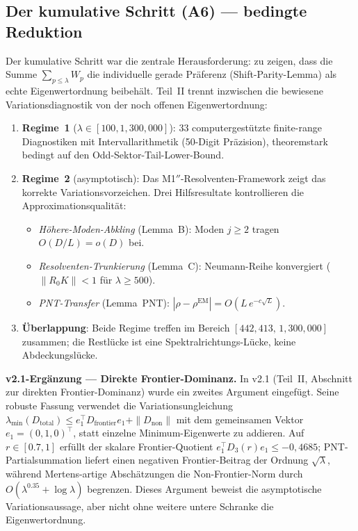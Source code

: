 \documentclass[12pt,a4paper]{article}
\theoremstyle{definition}
\theoremstyle{remark}
\begin{document}
\subsection{Der kumulative Schritt (A6) --- bedingte Reduktion}

Der kumulative Schritt war die zentrale Herausforderung: zu zeigen, dass die Summe $\sum_{p \leq \lambda} W_p$ die individuelle gerade Präferenz (Shift-Parity-Lemma) als echte Eigenwertordnung beibehält. Teil~II trennt inzwischen die bewiesene Variationsdiagnostik von der noch offenen Eigenwertordnung:

\begin{enumerate}
  \item \textbf{Regime~1} ($\lambda \in [100, 1{,}300{,}000]$): $33$ computergestützte finite-range Diagnostiken mit Intervallarithmetik (50-Digit Präzision), theoremstark bedingt auf den Odd-Sektor-Tail-Lower-Bound.
  \item \textbf{Regime~2} (asymptotisch): Das M1$''$-Resolventen-Framework zeigt das korrekte Variationsvorzeichen. Drei Hilfsresultate kontrollieren die Approximationsqualität:
  \begin{itemize}
    \item \emph{Höhere-Moden-Abkling} (Lemma~B): Moden $j \geq 2$ tragen $O(D/L) = o(D)$ bei.
    \item \emph{Resolventen-Trunkierung} (Lemma~C): Neumann-Reihe konvergiert ($\|R_0 K\| < 1$ für $\lambda \geq 500$).
    \item \emph{PNT-Transfer} (Lemma~PNT): $|\rho - \rho^{\mathrm{EM}}| = O(L\,e^{-c\sqrt{L}})$.
  \end{itemize}
  \item \textbf{Überlappung}: Beide Regime treffen im Bereich $[442{,}413,\, 1{,}300{,}000]$ zusammen; die Restlücke ist eine Spektralrichtungs-Lücke, keine Abdeckungslücke.
\end{enumerate}

\smallskip
\noindent\textbf{v2.1-Ergänzung --- Direkte Frontier-Dominanz.} In v2.1 (Teil~II, Abschnitt zur direkten Frontier-Dominanz) wurde ein zweites Argument eingefügt. Seine robuste Fassung verwendet die Variationsungleichung $\lambda_{\min}(D_{\mathrm{total}})\leq e_1^\top D_{\mathrm{frontier}}e_1+\|D_{\mathrm{non}}\|$ mit dem gemeinsamen Vektor $e_1=(0,1,0)^\top$, statt einzelne Minimum-Eigenwerte zu addieren. Auf $r\in[0.7,1]$ erfüllt der skalare Frontier-Quotient $e_1^\top D_3(r)e_1\leq -0{,}4685$; PNT-Partialsummation liefert einen negativen Frontier-Beitrag der Ordnung $\sqrt{\lambda}$, während Mertens-artige Abschätzungen die Non-Frontier-Norm durch $O(\lambda^{0.35}+\log\lambda)$ begrenzen. Dieses Argument beweist die asymptotische Variationsaussage, aber nicht ohne weitere untere Schranke die Eigenwertordnung.
\end{document}
